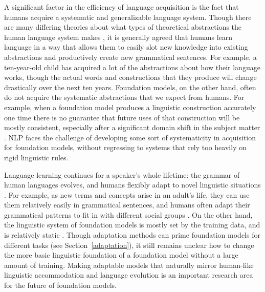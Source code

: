 A significant factor in the efficiency of language acquisition is the fact that humans acquire a systematic and generalizable language system. Though there are many differing theories about what types of theoretical abstractions the human language system makes \citep[e.g. ][]{comrie1989language, chomsky2014minimalist, croft2001radical, jackendoff2011human}, it is generally agreed that humans learn language in a way that allows them to easily slot new knowledge into existing abstractions and productively create new grammatical sentences. For example, a ten-year-old child has acquired a lot of the abstractions about how their language works, though the actual words and constructions that they produce will change drastically over the next ten years. Foundation models, on the other hand, often do not acquire the systematic abstractions that we expect from humans. For example, when a foundation model produces a linguistic construction accurately one time there is no guarantee that future uses of that construction will be mostly consistent, especially after a significant domain shift in the subject matter \citep[examples of work examining limitations of foundation models in systematicity include][]{lake2018generalization, kim2020cogs, bahdanau2018systematic, chaabouni2021can}. NLP faces the challenge of developing some sort of systematicity in acquisition for foundation models, without regressing to systems that rely too heavily on rigid linguistic rules.

Language learning continues for a speaker's whole lifetime: the grammar of human languages evolves, and humans flexibly adapt to novel linguistic situations \citep{sankoff2018change}. For example, as new terms and concepts arise in an adult's life, they can use them relatively easily in grammatical sentences, and humans often adapt their grammatical patterns to fit in with different social groups \citep{rickford1994addressee}. On the other hand, the linguistic system of foundation models is mostly set by the training data, and is relatively static \citep{lazaridou2021pitfalls, Khandelwal2020Generalization}. Though adaptation methods can prime foundation models for different tasks (see Section~\ref{adaptation}), it still remains unclear how to change the more basic linguistic foundation of a foundation model without a large amount of training. Making adaptable models that naturally mirror human-like linguistic accommodation and language evolution is an important research area for the future of foundation models.

